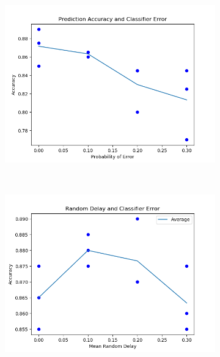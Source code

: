 \documentclass[12pt]{article}
\begin{document}
\begin{figure}
    \centering
    \begin{subfigure}{0.3\textwidth}
        \includegraphics[width=\textwidth]{plot_1_line_and_points.png}
    \end{subfigure}
    ~
    \begin{subfigure}{0.3\textwidth}
        \includegraphics[width=\textwidth]{plot_2_line_and_points.png}
    \end{subfigure}
    ~
    \begin{subfigure}{0.3\textwidth}

\end{subfigure}
\end{figure}
\end{document}
